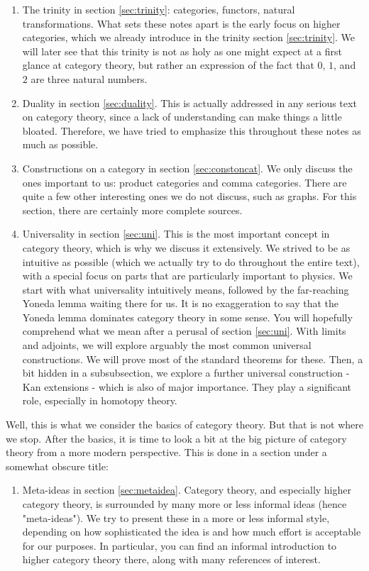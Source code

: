 \begin{enumerate}
\item[$\bullet$]
The trinity in section \ref{sec:trinity}: categories, functors, natural transformations.
What sets these notes apart is the early focus on higher categories, which we already introduce in the trinity section \ref{sec:trinity}.
We will later see that this trinity is not as {\glqq}holy{\grqq} as one might expect at a first glance at category theory, but rather an expression of the fact that $0$, $1$, and $2$ are three natural numbers.
\item[$\bullet$]
Duality in section \ref{sec:duality}.
This is actually addressed in any serious text on category theory, since a lack of understanding can make things a little bloated.
Therefore, we have tried to emphasize this throughout these notes as much as possible.
\item[$\bullet$]
Constructions on a category in section \ref{sec:constoncat}.
We only discuss the ones important to us: product categories and comma categories.
There are quite a few other interesting ones we do not discuss, such as graphs.
For this section, there are certainly more complete sources.
\item[$\bullet$]
Universality in section \ref{sec:uni}.
This is the most important concept in category theory, which is why we discuss it extensively.
We strived to be as intuitive as possible (which we actually try to do throughout the entire text), with a special focus on parts that are particularly important to physics.
We start with what {\glqq}universality{\grqq} intuitively means, followed by the far-reaching Yoneda lemma waiting there for us.
It is no exaggeration to say that the Yoneda lemma dominates category theory in some sense.
You will hopefully comprehend what we mean after a perusal of section \ref{sec:uni}.
With limits and adjoints, we will explore arguably the most common {\glqq}universal constructions{\grqq}.
We will prove most of the standard theorems for these.
Then, a bit hidden in a subsubsection, we explore a further universal construction - Kan extensions - which is also of major importance.
They play a significant role, especially in homotopy theory.
\end{enumerate}
Well, this is what we consider the basics of category theory.
But that is not where we stop.
After the basics, it is time to look a bit at the big picture of category theory from a more modern perspective.
This is done in a section under a somewhat obscure title:
\begin{enumerate}
\item[$\bullet$]
Meta-ideas in section \ref{sec:metaidea}.
Category theory, and especially higher category theory, is surrounded by many more or less informal ideas (hence "meta-ideas").
We try to present these in a more or less informal style, depending on how sophisticated the idea is and how much effort is acceptable for our purposes.
In particular, you can find an informal introduction to higher category theory there, along with many references of interest.
\end{enumerate}
